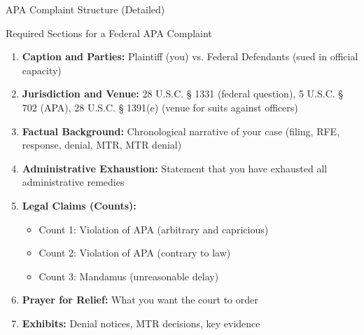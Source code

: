 \documentclass[11pt]{beamer}
\begin{document}
	\begin{frame}{APA Complaint Structure (Detailed)}
		\scriptsize
		\begin{block}{Required Sections for a Federal APA Complaint}
			\begin{enumerate}
				\item \textbf{Caption and Parties:} Plaintiff (you) vs. Federal Defendants (sued in official capacity)
				\item \textbf{Jurisdiction and Venue:} 28 U.S.C. § 1331 (federal question), 5 U.S.C. § 702 (APA), 28 U.S.C. § 1391(e) (venue for suits against officers)
				\item \textbf{Factual Background:} Chronological narrative of your case (filing, RFE, response, denial, MTR, MTR denial)
				\item \textbf{Administrative Exhaustion:} Statement that you have exhausted all administrative remedies
				\item \textbf{Legal Claims (Counts):} 
				\begin{itemize}
					\item Count 1: Violation of APA (arbitrary and capricious)
					\item Count 2: Violation of APA (contrary to law)
					\item Count 3: Mandamus (unreasonable delay)
				\end{itemize}
				\item \textbf{Prayer for Relief:} What you want the court to order
				\item \textbf{Exhibits:} Denial notices, MTR decisions, key evidence
			\end{enumerate}
		\end{block}
	\end{frame}
	
\end{document}

